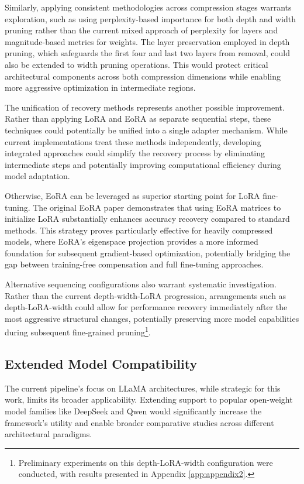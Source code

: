 Similarly, applying consistent methodologies across compression stages warrants exploration, such as using perplexity-based importance for both depth and width pruning rather than the current mixed approach of perplexity for layers and magnitude-based metrics for weights. The layer preservation employed in depth pruning, which safeguards the first four and last two layers from removal, could also be extended to width pruning operations. This would protect critical architectural components across both compression dimensions while enabling more aggressive optimization in intermediate regions.

The unification of recovery methods represents another possible improvement. Rather than applying LoRA and EoRA as separate sequential steps, these techniques could potentially be unified into a single adapter mechanism. While current implementations treat these methods independently, developing integrated approaches could simplify the recovery process by eliminating intermediate steps and potentially improving computational efficiency during model adaptation.

Otherwise, EoRA can be leveraged as superior starting point for LoRA fine-tuning. The original EoRA paper \cite{eora} demonstrates that using EoRA matrices to initialize LoRA substantially enhances accuracy recovery compared to standard methods. This strategy proves particularly effective for heavily compressed models, where EoRA's eigenspace projection provides a more informed foundation for subsequent gradient-based optimization, potentially bridging the gap between training-free compensation and full fine-tuning approaches.

Alternative sequencing configurations also warrant systematic investigation. Rather than the current depth-width-LoRA progression, arrangements such as depth-LoRA-width could allow for performance recovery immediately after the most aggressive structural changes, potentially preserving more model capabilities during subsequent fine-grained pruning\footnote{Preliminary experiments on this depth-LoRA-width configuration were conducted, with results presented in Appendix \ref{app:appendix2}.}.

\subsection{Extended Model Compatibility}
The current pipeline's focus on LLaMA architectures, while strategic for this work, limits its broader applicability. Extending support to popular open-weight model families like DeepSeek \cite{deepseek} and Qwen \cite{qwen} would significantly increase the framework's utility and enable broader comparative studies across different architectural paradigms.

